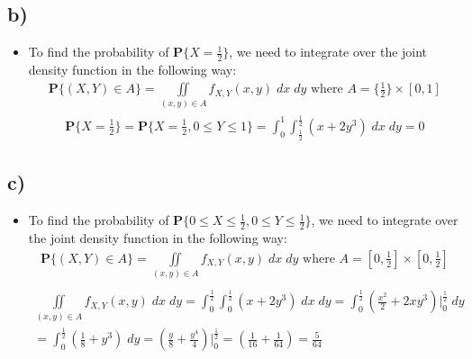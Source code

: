 \documentclass[12pt]{article}
\begin{document}
\subsection*{b)} 
\begin{itemize}
    \item To find the probability of $\textbf{P}\{X = \tfrac{1}{2}\}$, we need to integrate over the joint density function in the following way:
    \begin{equation*}
        \begin{split}
            \textbf{P}\{(X,Y) \in A\} = \iint\limits_{(x,y) \in A} f_{X,Y}(x,y)\;dx\;dy \text{ where } A = \{\tfrac{1}{2}\} \times [0,1]
        \end{split}
    \end{equation*}
    \begin{equation*}
        \begin{split}
            \textbf{P}\{X = \tfrac{1}{2}\} = \textbf{P}\{X = \tfrac{1}{2}, 0 \leq Y \leq 1\} = \int_{0}^{1}\int_{\tfrac{1}{2}}^{\tfrac{1}{2}}(x + 2y^3)\;dx\;dy = 0
        \end{split}
    \end{equation*}
\end{itemize}

\subsection*{c)} 
\begin{itemize}
    \item To find the probability of $\textbf{P}\{0 \leq X \leq \tfrac{1}{2}, 0 \leq Y \leq \tfrac{1}{2}\}$, we need to integrate over the joint density function in the following way:
    \begin{equation*}
        \begin{split}
            \textbf{P}\{(X,Y) \in A\} = \iint\limits_{(x,y) \in A} f_{X,Y}(x,y)\;dx\;dy \text{ where } A =  [0,\tfrac{1}{2}] \times [0,\tfrac{1}{2}]\\
        \end{split}
    \end{equation*}
    \begin{equation*}
        \begin{split}
            \iint\limits_{(x,y) \in A} f_{X,Y}(x,y)\;dx\;dy = \int_{0}^{\tfrac{1}{2}}\int_{0}^{\tfrac{1}{2}}(x + 2y^3)\;dx\;dy = \int_{0}^{\tfrac{1}{2}} \left(\frac{x^2}{2} + 2xy^3  \right)\Big|_{0}^{\tfrac{1}{2}}\;dy \\
            = \int_{0}^{\tfrac{1}{2}} \left(\frac{1}{8} + y^3\right)\;dy = \left(\frac{y}{8} + \frac{y^4}{4}\right) \Big|_{0}^{\tfrac{1}{2}} = \left(\frac{1}{16} + \frac{1}{64}\right) = \frac{5}{64}
        \end{split}
    \end{equation*}
\end{itemize}
\end{document}
